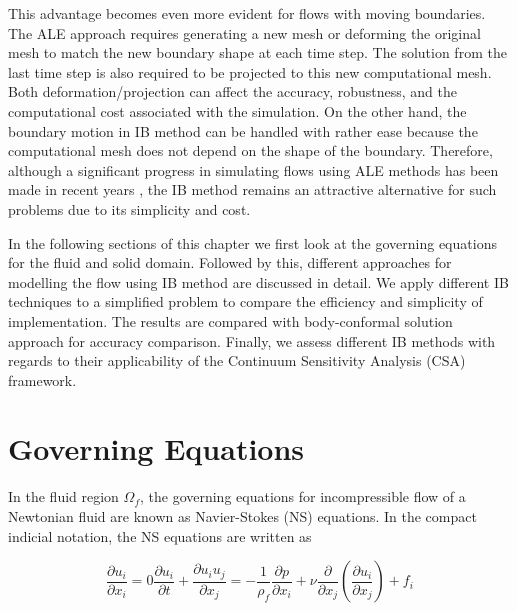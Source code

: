 This advantage becomes even more evident for flows with moving boundaries. The ALE approach requires generating a new mesh or deforming the original mesh to match the new boundary shape at each time step. The solution from the last time step is also required to be projected to this new computational mesh. Both deformation/projection can affect the accuracy, robustness, and the computational cost associated with the simulation. On the other hand, the boundary motion in IB method can be handled with rather ease because the computational mesh does not depend on the shape of the boundary. Therefore, although a significant progress in simulating flows using ALE methods has been made in recent years \cite{lomtev1999discontinuous, farhat2004cfd, cheng2005fluid}, the IB method remains an attractive alternative for such problems due to its simplicity and cost.

In the following sections of this chapter we first look at the governing equations for the fluid and solid domain. Followed by this, different approaches for modelling the flow using IB method are discussed in detail. We apply different IB techniques to a simplified problem to compare the efficiency and simplicity of implementation. The results are compared with body-conformal solution approach for accuracy comparison. Finally, we assess different IB methods with regards to their applicability of the Continuum Sensitivity Analysis (CSA) framework.

\section{Governing Equations}
In the fluid region $\Omega_f$, the governing equations for incompressible flow of a Newtonian fluid are known as Navier-Stokes (NS) equations. In the compact indicial notation, the NS equations are written as

\begin{subequations}\label{eq:C3_GE}
\begin{equation}\label{eq:C3_continuity}
    \frac{\partial u_i}{\partial x_i} = 0
\end{equation}
\begin{equation}\label{eq:C3_momentum}
    \frac{\partial u_i}{\partial t} + \frac{\partial u_i u_j}{\partial x_j} = 
    -\frac{1}{\rho_f    } \frac{\partial p}{\partial x_i} + 
    \nu \frac{\partial}{\partial x_j} \left( \frac{\partial u_i}{\partial x_j} \right) + 
    f_i
\end{equation}
\end{subequations}

